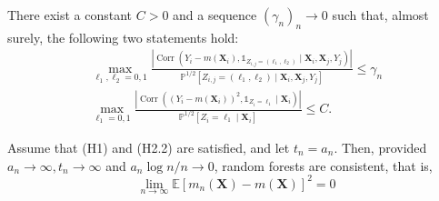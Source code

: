 \documentclass[10pt]{article}
\theoremstyle{definition}
\begin{document}
\begin{mainhyp}[2.2]
  There exist a constant $C>0$ and a sequence $\left(\gamma_n\right)_n
  \rightarrow 0$ such that, almost surely, the following two statements hold:
  \begin{align*}
                \max _{\ell_1, \ell_2=0,1} \frac{\left|\operatorname{Corr}\left(Y_i-m\left(\mathbf{X}_i\right), \mathbb{1}_{Z_{i, j}=\left(\ell_1, \ell_2\right)} \mid \mathbf{X}_i, \mathbf{X}_j, Y_j\right)\right|}{\mathbb{P}^{1 / 2}\left[Z_{i, j}=\left(\ell_1, \ell_2\right) \mid \mathbf{X}_i, \mathbf{X}_j, Y_j\right]} \leq \gamma_n \tag{H2.2a}\\
              \max _{\ell_1=0,1} \frac{\left|\operatorname{Corr}\left(\left(Y_i-m\left(\mathbf{X}_i\right)\right)^2, \mathbb{1}_{Z_i=\ell_1} \mid \mathbf{X}_i\right)\right|}{\mathbb{P}^{1 / 2}\left[Z_i=\ell_1 \mid \mathbf{X}_i\right]} \leq C . \tag{H2.2b}
  \end{align*}
 \end{mainhyp}


\begin{mainthm}
  Assume that (H1) and (H2.2) are satisfied, and let $t_n=a_n$. Then, provided
  $a_n \rightarrow \infty, t_n \rightarrow \infty$ and $a_n \log n / n
  \rightarrow 0$, random forests are consistent, that is,
  $$
  \lim _{n \rightarrow \infty}
  \mathbb{E}\left[m_n(\mathbf{X})-m(\mathbf{X})\right]^2=0
  $$
\end{mainthm}
\end{document}
